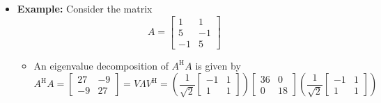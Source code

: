 \documentclass[11pt,twoside]{report}
\newcommand{\bbC}{{\mathbb{C}}}
\newcommand{\vecnot}{\underline}
\newcommand{\Herm}{{\mathrm{H}}}
\begin{document}
\begin{itemize}
\begin{itemize}
\item For $U_1 = [\vecnot{u}_1,\ldots,\vecnot{u}_r]$ and $V_1 = [\vecnot{v}_1,\ldots,\vecnot{v}_r]$, this gives 
\[
A  \begin{bmatrix}  V_1 &  V_2 \end{bmatrix}  =  \begin{bmatrix}  U_1 \Sigma_1 &  0_{m \times (n-r)} \end{bmatrix}
\]
where $\Sigma_1$ is a $r \times r$ diagonal matrix with diagonal entries $\sigma_1,\ldots,\sigma_r$

\item %
Thus, right multiplication by $V^\Herm = [V_1^\Herm \; V_2^\Herm]$ gives the \textbf{compact SVD} 
 \[  A = U_1 \Sigma_1 V_1^\Herm, \]
where the columns of $U_1, V_1$ are orthonormal bases for $\mathcal{R}(A), \mathcal{R}(A^\Herm)$

\item The  matrix $U_2 \in \bbC^{m \times (m-r)}$ can be chosen arbitrarily subject to the constraint that its columns form an orthonormal basis for $\cN(A^\top)$ 
\end{itemize}

\item \textbf{Example:} 
Consider the matrix 
\[ A = \begin{bmatrix} 
1 & 1 \\
5 & -1 \\
-1 & 5 
\end{bmatrix}  \]

\begin{itemize}

\item  An eigenvalue decomposition of $A^\Herm A$ is given by
\[
A^\Herm A = \begin{bmatrix} 
27 & -9 \\
-9 & 27
\end{bmatrix} 
=  V \Lambda V^\Herm
=  \left( \frac{1}{\sqrt{2}}\begin{bmatrix} 
-1 & 1 \\
1 & 1 
\end{bmatrix}  \right) 
\begin{bmatrix} 
36 & 0 \\
0 & 18
\end{bmatrix} 
\left( \frac{1}{\sqrt{2}} \begin{bmatrix} 
-1 & 1 \\
1 & 1 
\end{bmatrix} \right)
\]


\end{itemize}
\end{itemize}
\end{document}
